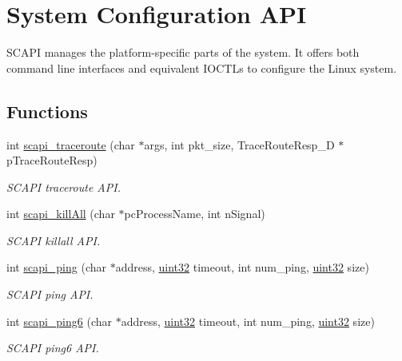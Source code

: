 \hypertarget{group__LIBSCAPI}{\section{System Configuration A\-P\-I}
\label{group__LIBSCAPI}
}


S\-C\-A\-P\-I manages the platform-\/specific parts of the system. It offers both command line interfaces and equivalent I\-O\-C\-T\-Ls to configure the Linux system.  


\subsection*{Functions}
\begin{DoxyCompactItemize}
\item 
int \hyperlink{group__LIBSCAPI_ga289ed7b7b67faf20a531abe400857729}{scapi\-\_\-traceroute} (char $\ast$args, int pkt\-\_\-size, Trace\-Route\-Resp\-\_\-\-D $\ast$p\-Trace\-Route\-Resp)
\begin{DoxyCompactList}\small\item\em S\-C\-A\-P\-I traceroute A\-P\-I. \end{DoxyCompactList}\item 
int \hyperlink{group__LIBSCAPI_gafa94602629980ae15611c822b2d65b76}{scapi\-\_\-kill\-All} (char $\ast$pc\-Process\-Name, int n\-Signal)
\begin{DoxyCompactList}\small\item\em S\-C\-A\-P\-I killall A\-P\-I. \end{DoxyCompactList}\item 
int \hyperlink{group__LIBSCAPI_gace833fc332d0cef672723322f36e0556}{scapi\-\_\-ping} (char $\ast$address, \hyperlink{commondefs_8h_a1134b580f8da4de94ca6b1de4d37975e}{uint32} timeout, int num\-\_\-ping, \hyperlink{commondefs_8h_a1134b580f8da4de94ca6b1de4d37975e}{uint32} size)
\begin{DoxyCompactList}\small\item\em S\-C\-A\-P\-I ping A\-P\-I. \end{DoxyCompactList}\item 
int \hyperlink{group__LIBSCAPI_ga57fa1c0b6d7d59978b07f47b98e2490d}{scapi\-\_\-ping6} (char $\ast$address, \hyperlink{commondefs_8h_a1134b580f8da4de94ca6b1de4d37975e}{uint32} timeout, int num\-\_\-ping, \hyperlink{commondefs_8h_a1134b580f8da4de94ca6b1de4d37975e}{uint32} size)
\begin{DoxyCompactList}\small\item\em S\-C\-A\-P\-I ping6 A\-P\-I. \end{DoxyCompactList}\item 

\end{DoxyCompactItemize}

